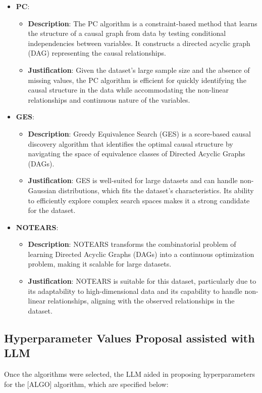 \documentclass{article}
\begin{document}
\begin{itemize}
    \item \textbf{PC}:
    \begin{itemize}
        \item \textbf{Description}: The PC algorithm is a constraint-based method that learns the structure of a causal graph from data by testing conditional independencies between variables. It constructs a directed acyclic graph (DAG) representing the causal relationships.
        \item \textbf{Justification}: Given the dataset's large sample size and the absence of missing values, the PC algorithm is efficient for quickly identifying the causal structure in the data while accommodating the non-linear relationships and continuous nature of the variables.
    \end{itemize}

    \item \textbf{GES}:
    \begin{itemize}
        \item \textbf{Description}: Greedy Equivalence Search (GES) is a score-based causal discovery algorithm that identifies the optimal causal structure by navigating the space of equivalence classes of Directed Acyclic Graphs (DAGs).
        \item \textbf{Justification}: GES is well-suited for large datasets and can handle non-Gaussian distributions, which fits the dataset's characteristics. Its ability to efficiently explore complex search spaces makes it a strong candidate for the dataset.
    \end{itemize}

    \item \textbf{NOTEARS}:
    \begin{itemize}
        \item \textbf{Description}: NOTEARS transforms the combinatorial problem of learning Directed Acyclic Graphs (DAGs) into a continuous optimization problem, making it scalable for large datasets.
        \item \textbf{Justification}: NOTEARS is suitable for this dataset, particularly due to its adaptability to high-dimensional data and its capability to handle non-linear relationships, aligning with the observed relationships in the dataset.
    \end{itemize}
\end{itemize}

\subsection{Hyperparameter Values Proposal assisted with LLM}
Once the algorithms were selected, the LLM aided in proposing hyperparameters for the [ALGO] algorithm, which are specified below:
\end{document}
